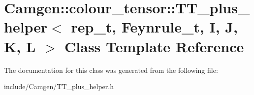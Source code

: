 \hypertarget{a00556}{}\section{Camgen\+:\+:colour\+\_\+tensor\+:\+:T\+T\+\_\+plus\+\_\+helper$<$ rep\+\_\+t, Feynrule\+\_\+t, I, J, K, L $>$ Class Template Reference}
\label{a00556}


The documentation for this class was generated from the following file\+:\begin{DoxyCompactItemize}
\item 
include/\+Camgen/T\+T\+\_\+plus\+\_\+helper.\+h\end{DoxyCompactItemize}
